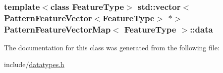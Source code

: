 \subsubsection[{data}]{\setlength{\rightskip}{0pt plus 5cm}template$<$class Feature\+Type$>$ std\+::vector$<${\bf Pattern\+Feature\+Vector}$<$Feature\+Type$>$ $\ast$$>$ {\bf Pattern\+Feature\+Vector\+Map}$<$ Feature\+Type $>$\+::data}\label{classPatternFeatureVectorMap_aa07d43ae4f1c409ae7ceb903d826cf6f}


The documentation for this class was generated from the following file\+:\begin{DoxyCompactItemize}
\item 
include/\hyperlink{datatypes_8h}{datatypes.\+h}\end{DoxyCompactItemize}
